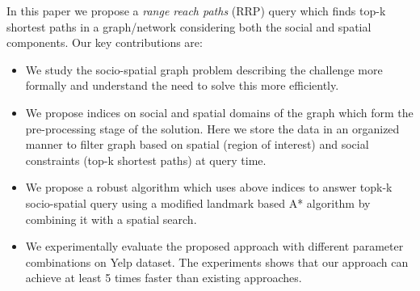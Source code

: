 In this paper we propose a \textit{range reach paths} (RRP) query which finds top-k shortest paths in a graph/network considering both the social and spatial components. Our key contributions are:
\begin{itemize}
	\item We study the socio-spatial graph problem describing the challenge more formally and understand the need to solve this more efficiently.
	\item We propose indices on social and spatial domains of the graph which form the pre-processing stage of the solution. Here we store the data in an organized manner to filter graph based on spatial (region of interest) and social constraints (top-k shortest paths) at query time.
	\item We propose a robust algorithm which uses above indices to answer topk-k socio-spatial query using a modified landmark based A* algorithm by combining it with a spatial search.
	\item We experimentally evaluate the proposed approach with different parameter combinations on Yelp dataset. The experiments shows that our approach can achieve at least 5 times faster than existing approaches. %
\end{itemize}

